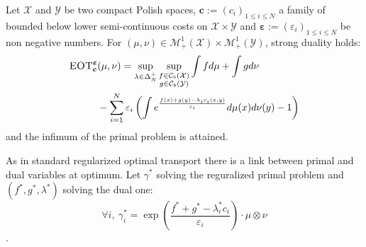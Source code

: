 \begin{thm}
\label{thm:duality-entropic}
Let $\mathcal{X}$ and $\mathcal{Y}$ be two compact Polish spaces, $\mathbf{c}:=(c_i)_{1\leq i\leq N}$ a family of bounded below lower semi-continuous costs on $\mathcal{X}\times\mathcal{Y}$ and $\bm{\varepsilon}:=(\varepsilon_i)_{1\leq i\leq N}$ be non negative numbers. For $(\mu,\nu)\in\mathcal{M}^1_{+}(\mathcal{X})\times\mathcal{M}_+^{1}(\mathcal{Y})$, strong duality holds:
\begin{align}
    \textsc{EOT}_{\mathbf{c}}^{\bm{\varepsilon}}&(\mu,\nu)=\sup_{\lambda\in\Delta^+_N} \sup\limits_{\substack{f\in\mathcal{C}_b(\mathcal{X})\\g\in\mathcal{C}_b(\mathcal{Y})}} \int fd\mu+ \int gd\nu\label{eq-dual-entrop}\\
 &-\sum_{i=1}^N\varepsilon_i\left( \int e^{\frac{f(x)+g(y)-\lambda_ic_i(x,y)}{\varepsilon_i}} d\mu(x)d\nu(y)-1\right)\notag
\end{align}
and the infimum of the primal problem is attained. 
\end{thm}
As in standard regularized optimal transport there is a link between primal and dual variables at optimum. Let $\gamma^*$ solving the reguralized primal problem and $(f^*,g^*,\lambda^*)$ solving the dual one: $$\forall i,~\gamma_i^* = \exp\left(\frac{f^*+g^*-\lambda^*_i c_i}{\varepsilon_i}\right)\cdot\mu\otimes\nu$$.
\vspace{-0.6cm}
 
